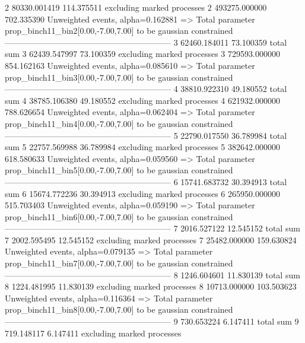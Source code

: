 2          80330.001419    114.375511      excluding marked processes    
2          493275.000000   702.335390      Unweighted events, alpha=0.162881
  => Total parameter prop_binch11_bin2[0.00,-7.00,7.00] to be gaussian constrained
------------------------------------------------------------
3          62460.184011    73.100359       total sum                     
3          62439.547997    73.100359       excluding marked processes    
3          729593.000000   854.162163      Unweighted events, alpha=0.085610
  => Total parameter prop_binch11_bin3[0.00,-7.00,7.00] to be gaussian constrained
------------------------------------------------------------
4          38810.922310    49.180552       total sum                     
4          38785.106380    49.180552       excluding marked processes    
4          621932.000000   788.626654      Unweighted events, alpha=0.062404
  => Total parameter prop_binch11_bin4[0.00,-7.00,7.00] to be gaussian constrained
------------------------------------------------------------
5          22790.017550    36.789984       total sum                     
5          22757.569988    36.789984       excluding marked processes    
5          382642.000000   618.580633      Unweighted events, alpha=0.059560
  => Total parameter prop_binch11_bin5[0.00,-7.00,7.00] to be gaussian constrained
------------------------------------------------------------
6          15741.683732    30.394913       total sum                     
6          15674.772236    30.394913       excluding marked processes    
6          265950.000000   515.703403      Unweighted events, alpha=0.059190
  => Total parameter prop_binch11_bin6[0.00,-7.00,7.00] to be gaussian constrained
------------------------------------------------------------
7          2016.527122     12.545152       total sum                     
7          2002.595495     12.545152       excluding marked processes    
7          25482.000000    159.630824      Unweighted events, alpha=0.079135
  => Total parameter prop_binch11_bin7[0.00,-7.00,7.00] to be gaussian constrained
------------------------------------------------------------
8          1246.604601     11.830139       total sum                     
8          1224.481995     11.830139       excluding marked processes    
8          10713.000000    103.503623      Unweighted events, alpha=0.116364
  => Total parameter prop_binch11_bin8[0.00,-7.00,7.00] to be gaussian constrained
------------------------------------------------------------
9          730.653224      6.147411        total sum                     
9          719.148117      6.147411        excluding marked processes    
